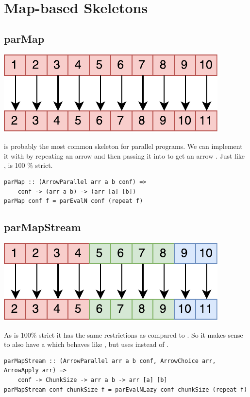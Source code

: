 \section{Map-based Skeletons}
\subsection{parMap}
\begin{center}
	\includegraphics[scale=0.7]{images/parMap}
\end{center}
 is probably the most common skeleton for parallel programs. We can implement it with  by repeating an arrow  and then passing it into  to get an arrow . 
Just like ,  is 100 \% strict.
\begin{lstlisting}[frame=htrbl]
parMap :: (ArrowParallel arr a b conf) =>
	conf -> (arr a b) -> (arr [a] [b])
parMap conf f = parEvalN conf (repeat f)
\end{lstlisting}

\subsection{parMapStream}
\begin{center}
	\includegraphics[scale=0.7]{images/parMapStream}
\end{center}
As  is 100\% strict it has the same restrictions as  compared to . So it makes sense to also have a  which behaves like , but uses  instead of .
\begin{lstlisting}[frame=htrbl]
parMapStream :: (ArrowParallel arr a b conf, ArrowChoice arr, ArrowApply arr) =>
	conf -> ChunkSize -> arr a b -> arr [a] [b]
parMapStream conf chunkSize f = parEvalNLazy conf chunkSize (repeat f)
\end{lstlisting}

